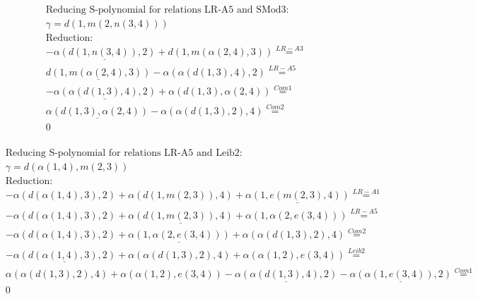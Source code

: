 \documentclass[11pt]{amsart}
\begin{document}
\begin{align*} 
& \text{Reducing S-polynomial for relations LR-A5 and SMod3:} \\ 
& \gamma = d(1,m(2,n(3,4))) \\ 
& \text{Reduction}: \\& - \underline{\alpha(d(1,n(3,4)),2)} + d(1,m(\alpha(2,4),3)) \stackrel{ LR-A3 }{=}  \\ 
&\underline{d(1,m(\alpha(2,4),3))} - \alpha(\alpha(d(1,3),4),2) \stackrel{ LR-A5 }{=}  \\ 
& - \underline{\alpha(\alpha(d(1,3),4),2)} + \alpha(d(1,3),\alpha(2,4)) \stackrel{ Com1 }{=}  \\ 
&\underline{\alpha(d(1,3),\alpha(2,4))} - \alpha(\alpha(d(1,3),2),4) \stackrel{ Com2 }{=}  \\ 
&0\\ 
\end{align*} 
 
\begin{align*} 
& \text{Reducing S-polynomial for relations LR-A5 and Leib2:} \\ 
& \gamma = d(\alpha(1,4),m(2,3)) \\ 
& \text{Reduction}: \\& - \alpha(d(\alpha(1,4),3),2) + \alpha(d(1,m(2,3)),4) + \underline{\alpha(1,e(m(2,3),4))} \stackrel{ LR-A1 }{=}  \\ 
& - \alpha(d(\alpha(1,4),3),2) + \underline{\alpha(d(1,m(2,3)),4)} + \alpha(1,\alpha(2,e(3,4))) \stackrel{ LR-A5 }{=}  \\ 
& - \alpha(d(\alpha(1,4),3),2) + \underline{\alpha(1,\alpha(2,e(3,4)))} + \alpha(\alpha(d(1,3),2),4) \stackrel{ Com2 }{=}  \\ 
& - \underline{\alpha(d(\alpha(1,4),3),2)} + \alpha(\alpha(d(1,3),2),4) + \alpha(\alpha(1,2),e(3,4)) \stackrel{ Leib2 }{=}  \\ 
&\alpha(\alpha(d(1,3),2),4) + \alpha(\alpha(1,2),e(3,4)) - \underline{\alpha(\alpha(d(1,3),4),2)} - \underline{\alpha(\alpha(1,e(3,4)),2)} \stackrel{ Com1 }{=}  \\ 
&0\\ 
\end{align*} 
 
\end{document}
